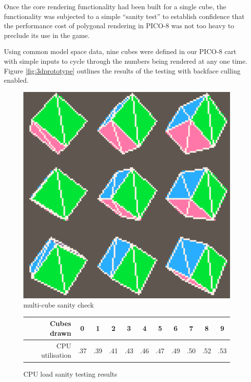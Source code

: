 \documentclass[11pt]{article}
\begin{document}
Once the core rendering functionality had been built for a single cube, the functionality
was subjected to a simple ``sanity test'' to establish confidence that the performance
cost of polygonal rendering in PICO-8 was not too heavy to preclude its use in the
game.

Using common model space data, nine cubes were defined in our PICO-8 cart with simple inputs
to cycle through the numbers being rendered at any one time. Figure \ref{fig:3dprototype}
outlines the results of the testing with backface culling enabled.


\begin{figure}[h]
  \centering
  \includegraphics[width=.8\linewidth]{test3d}
  \caption{multi-cube sanity check}
  \label{fig:3dfig2}
\end{figure}

\begin{figure}[h]
\begin{center}
\begin{tabular}{r|c c c c c c c c c c}
     Cubes drawn & 0 & 1 & 2 & 3 & 4 & 5 & 6 & 7 & 8 & 9 \\
     \hline
     CPU utilisation & .37 & .39 & .41 & .43 & .46 & .47 & .49 & .50 & .52 & .53
\end{tabular}
\end{center}
\caption{CPU load sanity testing results}
\label{fig:3dtest}
\end{figure}
\end{document}
